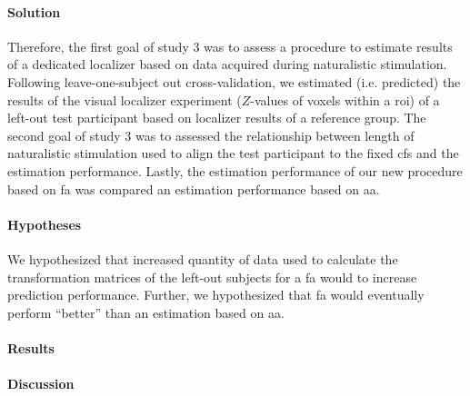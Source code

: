 \paragraph{Solution}
%
Therefore, the first goal of study 3 was to assess a procedure to estimate
results of a dedicated localizer \citep{sengupta2016extension} based on data
acquired during naturalistic stimulation.
%
Following leave-one-subject out cross-validation, we estimated (i.e. predicted)
the results of the visual localizer experiment ($Z$-values of voxels within a
\ac{roi}) of a left-out test participant based on localizer results of a
reference group.
The second goal of study 3 was to assessed the relationship between length of
naturalistic stimulation used to align the test participant to the fixed
\ac{cfs} and the estimation performance.
%
Lastly, the estimation performance of our new procedure based on \ac{fa} was
compared an estimation performance based on \ac{aa}.


\paragraph{Hypotheses}
%
We hypothesized that increased quantity of data used to calculate the
transformation matrices of the left-out subjects for a \ac{fa} would to increase
prediction performance.
%
Further, we hypothesized that \ac{fa} would eventually perform
``better'' than an estimation based on \ac{aa}.


\paragraph{Results}


\paragraph{Discussion}
